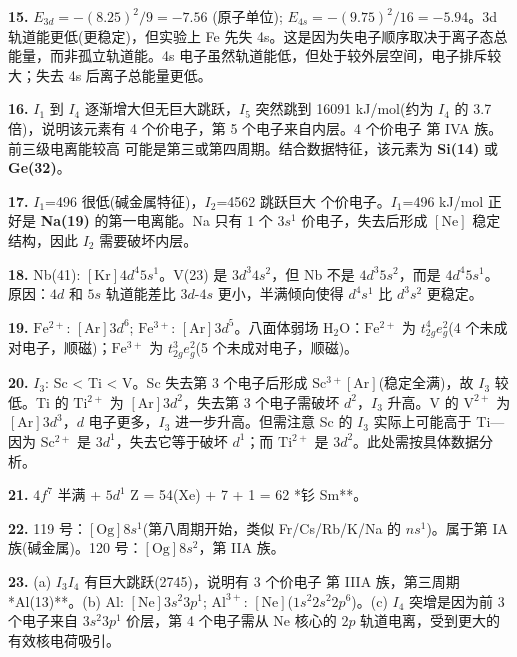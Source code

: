 \textbf{15.} \(E_{3d} = -(8.25)^2/9 = -7.56\) (原子单位); \(E_{4s} = -(9.75)^2/16 = -5.94\)。3d 轨道能更低(更稳定)，但实验上 Fe 先失 4s。这是因为失电子顺序取决于离子态总能量，而非孤立轨道能。4s 电子虽然轨道能低，但处于较外层空间，电子排斥较大；失去 4s 后离子总能量更低。

\textbf{16.} \(I_1\) 到 \(I_4\) 逐渐增大但无巨大跳跃，\(I_5\) 突然跳到 16091 kJ/mol(约为 \(I_4\) 的 3.7 倍)，说明该元素有 4 个价电子，第 5 个电子来自内层。4 个价电子 \箭 第 IVA 族。前三级电离能较高 \箭 可能是第三或第四周期。结合数据特征，该元素为 \textbf{Si(14)} 或 \textbf{Ge(32)}。

\textbf{17.} \(I_1\)=496 很低(碱金属特征)，\(I_2\)=4562 跳跃巨大  个价电子。\(I_1\)=496 kJ/mol 正好是 \textbf{Na(19)} 的第一电离能。Na 只有 1 个 \(3s^1\) 价电子，失去后形成 \([\mathrm{Ne}]\) 稳定结构，因此 \(I_2\) 需要破坏内层。

\textbf{18.} Nb(41): \([\mathrm{Kr}]4d^4 5s^1\)。V(23) 是 \(3d^3 4s^2\)，但 Nb 不是 \(4d^3 5s^2\)，而是 \(4d^4 5s^1\)。原因：\(4d\) 和 \(5s\) 轨道能差比 \(3d\)-\(4s\) 更小，半满倾向使得 \(d^4 s^1\) 比 \(d^3 s^2\) 更稳定。

\textbf{19.} \(\mathrm{Fe^{2+}}\): \([\mathrm{Ar}]3d^6\); \(\mathrm{Fe^{3+}}\): \([\mathrm{Ar}]3d^5\)。八面体弱场 \(\mathrm{H_2O}\)：\(\mathrm{Fe^{2+}}\) 为 \(t_{2g}^4 e_g^2\)(4 个未成对电子，顺磁)；\(\mathrm{Fe^{3+}}\) 为 \(t_{2g}^3 e_g^2\)(5 个未成对电子，顺磁)。

\textbf{20.} \(I_3\): Sc \textless{} Ti \textless{} V。Sc 失去第 3 个电子后形成 \(\mathrm{Sc^{3+}} [\mathrm{Ar}]\)(稳定全满)，故 \(I_3\) 较低。Ti 的 \(\mathrm{Ti^{2+}}\) 为 \([\mathrm{Ar}]3d^2\)，失去第 3 个电子需破坏 \(d^2\)，\(I_3\) 升高。V 的 \(\mathrm{V^{2+}}\) 为 \([\mathrm{Ar}]3d^3\)，\(d\) 电子更多，\(I_3\) 进一步升高。但需注意 Sc 的 \(I_3\) 实际上可能高于 Ti---因为 \(\mathrm{Sc^{2+}}\) 是 \(3d^1\)，失去它等于破坏 \(d^1\)；而 \(\mathrm{Ti^{2+}}\) 是 \(3d^2\)。此处需按具体数据分析。

\textbf{21.} \(4f^7\) 半满 + \(5d^1\) \箭 Z = 54(Xe) + 7 + 1 = 62 \箭 **钐 Sm**。

\textbf{22.} 119 号：\([\mathrm{Og}]8s^1\)(第八周期开始，类似 Fr/Cs/Rb/K/Na 的 \(ns^1\))。属于第 IA 族(碱金属)。120 号：\([\mathrm{Og}]8s^2\)，第 IIA 族。

\textbf{23.} (a) \(I_3\)\箭\(I_4\) 有巨大跳跃(2745)，说明有 3 个价电子 \箭 第 IIIA 族，第三周期 \箭 **Al(13)**。(b) Al: \([\mathrm{Ne}]3s^2 3p^1\); \(\mathrm{Al^{3+}}\): \([\mathrm{Ne}]\)(\(1s^2 2s^2 2p^6\))。(c) \(I_4\) 突增是因为前 3 个电子来自 \(3s^2 3p^1\) 价层，第 4 个电子需从 \(\mathrm{Ne}\) 核心的 \(2p\) 轨道电离，受到更大的有效核电荷吸引。

